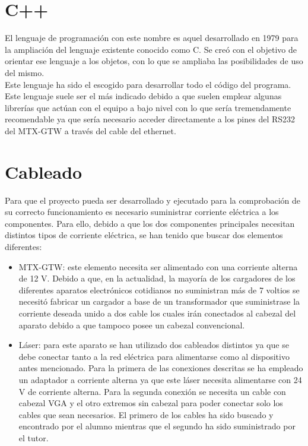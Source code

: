 \section{C++}

El lenguaje de programación con este nombre es aquel desarrollado en 1979 para la ampliación del lenguaje existente conocido como C. Se creó con el objetivo de orientar ese lenguaje a los objetos, con lo que se ampliaba las posibilidades de uso del mismo.\\
Este lenguaje ha sido el escogido para desarrollar todo el código del programa. Este lenguaje suele ser el más indicado debido a que suelen emplear algunas librerías que actúan con el equipo a bajo nivel con lo que sería tremendamente recomendable ya que sería necesario acceder directamente a los pines del RS232 del MTX-GTW a través del cable del ethernet.

\section{Cableado}

Para que el proyecto pueda ser desarrollado y ejecutado para la comprobación de su correcto funcionamiento es necesario suministrar corriente eléctrica a los componentes. Para ello, debido a que los dos componentes principales necesitan distintos tipos de corriente eléctrica, se han tenido que buscar dos elementos diferentes:
\begin{itemize}
	\item MTX-GTW: este elemento necesita ser alimentado con una corriente alterna de 12 V. Debido a que, en la actualidad, la mayoría de los cargadores de los diferentes aparatos electrónicos cotidianos no suministran más de 7 voltios se necesitó fabricar un cargador a base de un transformador que suministrase la corriente deseada unido a dos cable los cuales irán conectados al cabezal del aparato debido a que tampoco posee un cabezal convencional.\\
	\item Láser: para este aparato se han utilizado dos cableados distintos ya que se debe conectar tanto a la red eléctrica para alimentarse como al dispositivo antes mencionado. Para la primera de las conexiones descritas se ha empleado un adaptador a corriente alterna ya que este láser necesita alimentarse con 24 V de corriente alterna. Para la segunda conexión se necesita un cable con cabezal VGA y el otro extremos sin cabezal para poder conectar solo los cables que sean necesarios. El primero de los cables ha sido buscado y encontrado por el alumno mientras que el segundo ha sido suministrado por el tutor.
\end{itemize}
